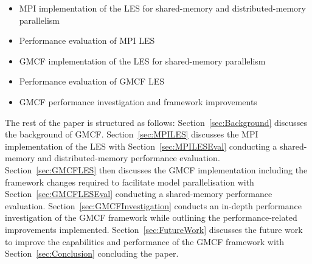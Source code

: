 \begin{itemize}[noitemsep,nolistsep]

    \item MPI implementation of the LES for shared-memory and distributed-memory
    parallelism

    \item Performance evaluation of MPI LES

    \item GMCF implementation of the LES for shared-memory parallelism

    \item Performance evaluation of GMCF LES

    \item GMCF performance investigation and framework improvements

\end{itemize}

The rest of the paper is structured as follows: Section~\ref{sec:Background}
discusses the background of GMCF. Section~\ref{sec:MPILES} discusses the MPI
implementation of the LES with Section~\ref{sec:MPILESEval} conducting a
shared-memory and distributed-memory performance evaluation.
Section~\ref{sec:GMCFLES} then discusses the GMCF implementation including the
framework changes required to facilitate model parallelisation with
Section~\ref{sec:GMCFLESEval} conducting a shared-memory performance evaluation.
Section~\ref{sec:GMCFInvestigation} conducts an in-depth performance
investigation of the GMCF framework while outlining the performance-related
improvements implemented. Section~\ref{sec:FutureWork} discusses the future work
to improve the capabilities and performance of the GMCF framework with
Section~\ref{sec:Conclusion} concluding the paper.
